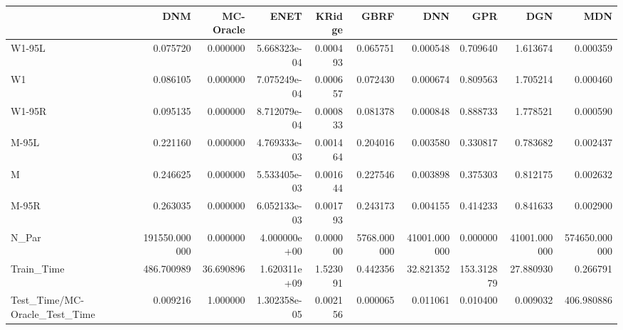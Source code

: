 \begin{tabular}{lrrrrrrrrr}
\toprule
{} &            DNM &  MC-Oracle &          ENET &    KRidge &         GBRF &           DNN &         GPR &           DGN &            MDN \\
\midrule
W1-95L                        &       0.075720 &   0.000000 &  5.668323e-04 &  0.000493 &     0.065751 &      0.000548 &    0.709640 &      1.613674 &       0.000359 \\
W1                            &       0.086105 &   0.000000 &  7.075249e-04 &  0.000657 &     0.072430 &      0.000674 &    0.809563 &      1.705214 &       0.000460 \\
W1-95R                        &       0.095135 &   0.000000 &  8.712079e-04 &  0.000833 &     0.081378 &      0.000848 &    0.888733 &      1.778521 &       0.000590 \\
M-95L                         &       0.221160 &   0.000000 &  4.769333e-03 &  0.001464 &     0.204016 &      0.003580 &    0.330817 &      0.783682 &       0.002437 \\
M                             &       0.246625 &   0.000000 &  5.533405e-03 &  0.001644 &     0.227546 &      0.003898 &    0.375303 &      0.812175 &       0.002632 \\
M-95R                         &       0.263035 &   0.000000 &  6.052133e-03 &  0.001793 &     0.243173 &      0.004155 &    0.414233 &      0.841633 &       0.002900 \\
N\_Par                         &  191550.000000 &   0.000000 &  4.000000e+00 &  0.000000 &  5768.000000 &  41001.000000 &    0.000000 &  41001.000000 &  574650.000000 \\
Train\_Time                    &     486.700989 &  36.690896 &  1.620311e+09 &  1.523091 &     0.442356 &     32.821352 &  153.312879 &     27.880930 &       0.266791 \\
Test\_Time/MC-Oracle\_Test\_Time &       0.009216 &   1.000000 &  1.302358e-05 &  0.002156 &     0.000065 &      0.011061 &    0.010400 &      0.009032 &     406.980886 \\
\bottomrule
\end{tabular}
